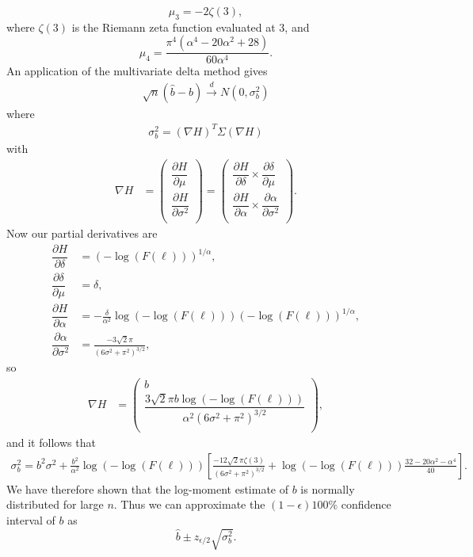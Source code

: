 \documentclass[honours,12pt,twoside, openright]{unswthesis}
\newcommand{\1}{\mathbf 1}
\newcommand{\cd}{\overset{d}{\longrightarrow}}
\newcommand{\ppartial}[2]{\dfrac{\partial {#1}}{\partial {#2} }}
\numberwithin{equation}{section}
\theoremstyle{definition}
\theoremstyle{remark}
\begin{document}
\begin{appendices}
\[
\mu_3=-2\zeta(3),
\]
where $\zeta(3)$ is the Riemann zeta function evaluated at 3, and
\[
\mu_4=\frac{\pi^4(\alpha^4-20\alpha^2+28)}{60\alpha^4}.
\] 
An application of the multivariate delta method gives
\begin{align*}
\sqrt{n}(\hat{b}-b)\cd N(0,\sigma^2_b)
\end{align*}
where
\begin{align*}
\sigma^2_b=(\nabla H)^T \Sigma (\nabla H)
\end{align*}
with
\begin{align*}
	\nabla H &=\begin{pmatrix}
		\ppartial{H}{\mu}\\
		\ppartial{H}{\sigma^2}\\
	\end{pmatrix}
	=\begin{pmatrix}
		\ppartial{H}{\delta}\times\ppartial{\delta}{\mu}\\
		\ppartial{H}{\alpha}\times\ppartial{\alpha}{\sigma^2}\\
	\end{pmatrix}.
\end{align*}
Now our partial derivatives are
\begin{align*}
\ppartial{H}{\delta}&=(-\log(F(\ell)))^{1/\alpha},\\ 
\ppartial{\delta}{\mu}&=\delta,\\
 \ppartial{H}{\alpha}&=-\frac{\delta}{\alpha^2}\log(-\log(F(\ell)))(-\log(F(\ell)))^{1/\alpha},\\ 
 \ppartial{\alpha}{\sigma^2}&=\frac{-3\sqrt{2}\pi}{(6\sigma^2+\pi^2)^{3/2}},
\end{align*}
so
\begin{align*}
	\nabla H &=\begin{pmatrix}
		b\\
		\dfrac{3\sqrt{2}\pi b \log(-\log(F(\ell)))}{\alpha^2(6\sigma^2+\pi^2)^{3/2}} \\
	\end{pmatrix},
\end{align*}
and it follows that
\begin{align*}
 \sigma^2_b= b^2\sigma^2 +\frac{b^2}{\alpha^2}\log(-\log(F(\ell)))
 \left[
 \frac{-12\sqrt{2}\pi\zeta(3)}{(6\sigma^2+\pi^2)^{3/2}} + \log(-\log(F(\ell)))\frac{32-20\alpha^2-\alpha^4}{40}
 \right].
\end{align*}
We have therefore shown that the log-moment estimate of $b$ is normally distributed for large $n$. Thus we can approximate the $(1-\epsilon)100\%$ confidence interval of $b$ as
\[
	\hat{b}\pm z_{\epsilon/2}\sqrt{\sigma^2_b}.
\]

\end{appendices}
\end{document}

